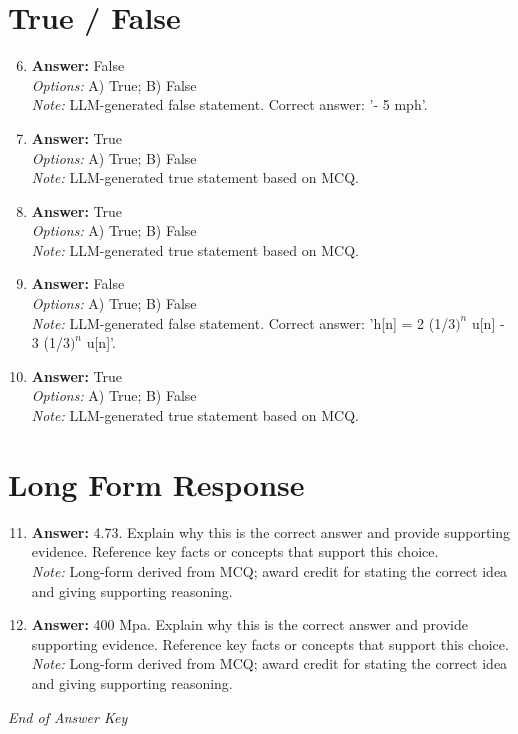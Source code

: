 \documentclass[12pt]{article}
\begin{document}
\section*{True / False}
\begin{enumerate}[label=\arabic*.]
\setcounter{enumi}{5}
\item \textbf{Answer:} False
\\ \textit{Options:} A) True; B) False
\\ \textit{Note:} LLM-generated false statement. Correct answer: '- 5 mph'.
\item \textbf{Answer:} True
\\ \textit{Options:} A) True; B) False
\\ \textit{Note:} LLM-generated true statement based on MCQ.
\item \textbf{Answer:} True
\\ \textit{Options:} A) True; B) False
\\ \textit{Note:} LLM-generated true statement based on MCQ.
\item \textbf{Answer:} False
\\ \textit{Options:} A) True; B) False
\\ \textit{Note:} LLM-generated false statement. Correct answer: 'h[n] = 2 (1/$3)^n$ u[n] - 3 (1/$3)^n$ u[n]'.
\item \textbf{Answer:} True
\\ \textit{Options:} A) True; B) False
\\ \textit{Note:} LLM-generated true statement based on MCQ.
\end{enumerate}

\section*{Long Form Response}
\begin{enumerate}[label=\arabic*.]
\setcounter{enumi}{10}
\item \textbf{Answer:} 4.73. Explain why this is the correct answer and provide supporting evidence. Reference key facts or concepts that support this choice.
\\ \textit{Note:} Long-form derived from MCQ; award credit for stating the correct idea and giving supporting reasoning.
\item \textbf{Answer:} 400 Mpa. Explain why this is the correct answer and provide supporting evidence. Reference key facts or concepts that support this choice.
\\ \textit{Note:} Long-form derived from MCQ; award credit for stating the correct idea and giving supporting reasoning.
\end{enumerate}

\vfill
\noindent\textit{End of Answer Key}
\end{document}
